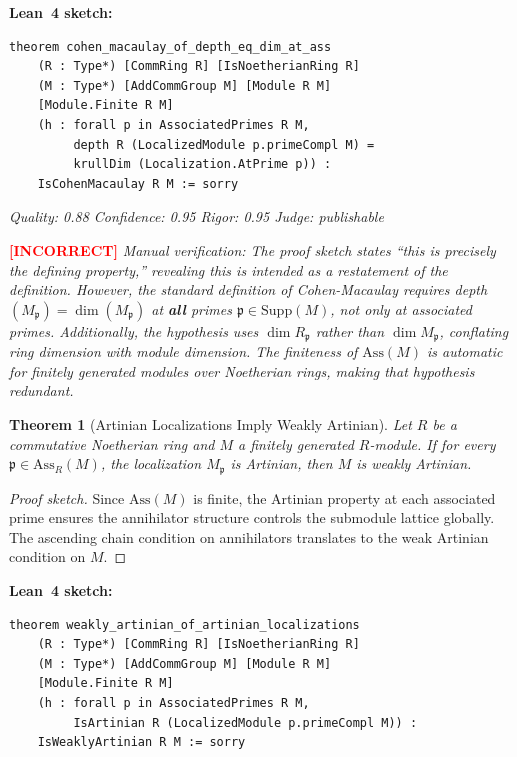 \documentclass[11pt,a4paper]{article}
\newtheorem{theorem}{Theorem}
\begin{document}
\noindent\textbf{Lean~4 sketch:}
\begin{verbatim}
theorem cohen_macaulay_of_depth_eq_dim_at_ass
    (R : Type*) [CommRing R] [IsNoetherianRing R]
    (M : Type*) [AddCommGroup M] [Module R M]
    [Module.Finite R M]
    (h : forall p in AssociatedPrimes R M,
         depth R (LocalizedModule p.primeCompl M) =
         krullDim (Localization.AtPrime p)) :
    IsCohenMacaulay R M := sorry
\end{verbatim}

\medskip
\noindent\emph{Quality: 0.88 \quad Confidence: 0.95 \quad Rigor: 0.95 \quad Judge: publishable}

\noindent\textcolor{red}{\textbf{[INCORRECT]}} \emph{Manual verification: The proof sketch states ``this is precisely the defining property,'' revealing this is intended as a restatement of the definition. However, the standard definition of Cohen-Macaulay requires depth$(M_\mathfrak{p}) = \dim(M_\mathfrak{p})$ at \textbf{all} primes $\mathfrak{p} \in \mathrm{Supp}(M)$, not only at associated primes. Additionally, the hypothesis uses $\dim R_\mathfrak{p}$ rather than $\dim M_\mathfrak{p}$, conflating ring dimension with module dimension. The finiteness of $\mathrm{Ass}(M)$ is automatic for finitely generated modules over Noetherian rings, making that hypothesis redundant.}


\begin{theorem}[Artinian Localizations Imply Weakly Artinian]
\label{thm:artinian_loc}
Let $R$ be a commutative Noetherian ring and $M$ a finitely generated $R$-module. If for every $\mathfrak{p} \in \mathrm{Ass}_R(M)$, the localization $M_{\mathfrak{p}}$ is Artinian, then $M$ is weakly Artinian.
\end{theorem}

\begin{proof}[Proof sketch]
Since $\mathrm{Ass}(M)$ is finite, the Artinian property at each associated prime ensures the annihilator structure controls the submodule lattice globally. The ascending chain condition on annihilators translates to the weak Artinian condition on $M$.
\end{proof}

\noindent\textbf{Lean~4 sketch:}
\begin{verbatim}
theorem weakly_artinian_of_artinian_localizations
    (R : Type*) [CommRing R] [IsNoetherianRing R]
    (M : Type*) [AddCommGroup M] [Module R M]
    [Module.Finite R M]
    (h : forall p in AssociatedPrimes R M,
         IsArtinian R (LocalizedModule p.primeCompl M)) :
    IsWeaklyArtinian R M := sorry
\end{verbatim}
\end{document}
